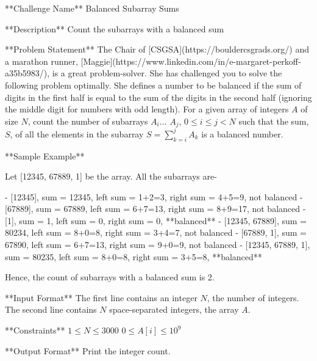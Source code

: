 **Challenge Name**  
Balanced Subarray Sums

**Description**  
Count the subarrays with a balanced sum

**Problem Statement**  
The Chair of [CSGSA](https://bouldercsgrads.org/) and a marathon runner, [Maggie](https://www.linkedin.com/in/e-margaret-perkoff-a35b5983/), is a great problem-solver. She has challenged you to solve the following problem optimally. She defines a number to be balanced if the sum of digits in the first half is equal to the sum of the digits in the second half (ignoring the middle digit for numbers with odd length). For a given array of integers $A$ of size $N$, count the number of subarrays $A_i$... $A_j$, $0 \leq i \leq j < N$ such that the sum, $S$, of all the elements in the subarray $S = \sum_{k=i}^j A_k$ is a balanced number.

**Sample Example**  

Let [12345, 67889, 1] be the array. All the subarrays are-  

- [12345], sum = 12345, left sum = 1+2=3, right sum = 4+5=9, not balanced  
- [67889], sum = 67889, left sum = 6+7=13, right sum = 8+9=17, not balanced  
- [1], sum = 1, left sum = 0, right sum = 0, **balanced**  
- [12345, 67889], sum = 80234, left sum = 8+0=8, right sum = 3+4=7, not balanced  
- [67889, 1], sum = 67890, left sum = 6+7=13, right sum = 9+0=9, not balanced  
- [12345, 67889, 1], sum = 80235, left sum = 8+0=8, right sum = 3+5=8, **balanced**  

Hence, the count of subarrays with a balanced sum is 2.


**Input Format**  
The first line contains an integer $N$, the number of integers.  
The second line contains $N$ space-separated integers, the array $A$.

**Constraints**  
$1 \leq N \leq 3000$  
$0 \leq A[i] \leq 10^9$  

**Output Format**  
Print the integer count.